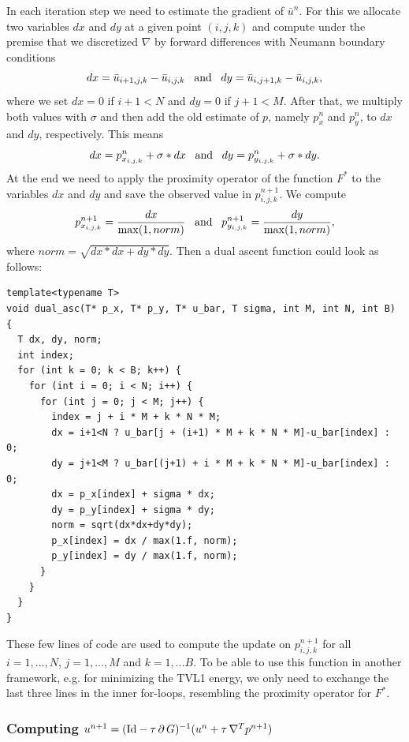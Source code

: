 \documentclass[abstracton]{scrreprt}
\begin{document}
                In each iteration step we need to estimate the gradient of $\bar{u}^{n}$. For this we allocate two variables $dx$ and $dy$ at a given point $(i,j,k)$ and compute under the premise that we discretized $\nabla$ by forward differences with Neumann boundary conditions
                    $$
                        dx = \bar{u}_{i+1,j,k} - \bar{u}_{i,j,k} \,\,\,\,\, \textnormal{and} \,\,\,\,\, dy = \bar{u}_{i,j+1,k} - \bar{u}_{i,j,k},
                    $$
                where we set $dx = 0$ if $i + 1 < N$ and $dy = 0$ if $j + 1 < M$. After that, we multiply both values with $\sigma$ and then add the old estimate of $p$, namely $p_{x}^{n}$ and $p_{y}^{n}$, to $dx$ and $dy$, respectively. This means
                    $$
                        dx = p_{x_{i,j,k}}^{n} + \sigma * dx \,\,\,\,\, \textnormal{and} \,\,\,\,\, dy = p_{y_{i,j,k}}^{n} + \sigma * dy.
                    $$
                At the end we need to apply the proximity operator of the function $F^{\ast}$ to the variables $dx$ and $dy$ and save the observed value in $p_{i,j,k}^{n+1}$. We compute
                    $$
                        p_{x_{i,j,k}}^{n+1} = \frac{dx}{\max(1, norm)} \,\,\,\,\, \textnormal{and} \,\,\,\,\, p_{y_{i,j,k}}^{n+1} = \frac{dy}{\max(1, norm)},
                    $$
                where $norm = \sqrt{dx*dx+dy*dy}$. Then a dual ascent function could look as follows:
                \begin{lstlisting}
template<typename T>
void dual_asc(T* p_x, T* p_y, T* u_bar, T sigma, int M, int N, int B) {
  T dx, dy, norm;
  int index;
  for (int k = 0; k < B; k++) {
    for (int i = 0; i < N; i++) {
      for (int j = 0; j < M; j++) {
        index = j + i * M + k * N * M;
        dx = i+1<N ? u_bar[j + (i+1) * M + k * N * M]-u_bar[index] : 0;
        dy = j+1<M ? u_bar[(j+1) + i * M + k * N * M]-u_bar[index] : 0;
        dx = p_x[index] + sigma * dx;
        dy = p_y[index] + sigma * dy;
        norm = sqrt(dx*dx+dy*dy);
        p_x[index] = dx / max(1.f, norm);
        p_y[index] = dy / max(1.f, norm);
      }
    }
  }
}
                \end{lstlisting}
            These few lines of code are used to compute the update on $p_{i,j,k}^{n+1}$ for all $i = 1, ..., N$, $j = 1, ..., M$ and $k = 1, ... B$. To be able to use this function in another framework, e.g. for minimizing the TVL1 energy, we only need to exchange the last three lines in the inner for-loops, resembling the proximity operator for $F^{\ast}$.

            \subsubsection{Computing $u^{n+1} = (\textnormal{Id} - \tau\,\partial\,G)^{-1}(u^{n} + \tau\,\nabla^{T}p^{n+1})$}
            \label{sub:computing_u}
\end{document}
